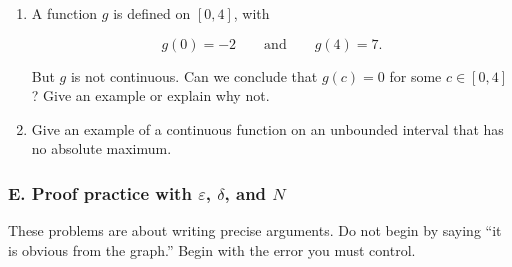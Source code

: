 \begin{enumerate}
What values must \(f\) take somewhere on \([0,4]\)?  What values might it take, but are not guaranteed by this information alone?

\item A function \(g\) is defined on \([0,4]\), with

\[
g(0)=-2
\qquad\text{and}\qquad
g(4)=7.
\]

But \(g\) is not continuous.  Can we conclude that \(g(c)=0\) for some \(c\in[0,4]\)?  Give an example or explain why not.

\item Give an example of a continuous function on an unbounded interval that has no absolute maximum.
\end{enumerate}

\subsubsection*{E. Proof practice with \(\varepsilon\), \(\delta\), and \(N\)}

These problems are about writing precise arguments.  Do not begin by saying ``it is obvious from the graph.''  Begin with the error you must control.

